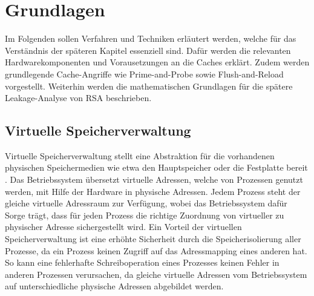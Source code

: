 \chapter{Grundlagen}
\label{chapter:basics}

Im Folgenden sollen Verfahren und Techniken %
erläutert werden, welche für das Verständnis der späteren Kapitel essenziell sind.
Dafür werden die relevanten Hardwarekomponenten und Vorausetzungen an die Caches erklärt.
Zudem werden grundlegende Cache-Angriffe wie Prime-and-Probe sowie Flush-and-Reload vorgestellt.
Weiterhin werden die mathematischen Grundlagen für die spätere Leakage-Analyse von RSA beschrieben.

\section{Virtuelle Speicherverwaltung}


Virtuelle Speicherverwaltung stellt eine Abstraktion für die vorhandenen physischen Speichermedien wie etwa den Hauptspeicher oder die Festplatte bereit \cite{tanenbaumVirtualMemory}.
Das Betriebssystem übersetzt virtuelle Adressen, welche von Prozessen genutzt werden, mit Hilfe der Hardware in physische Adressen. 
Jedem Prozess steht der gleiche virtuelle Adressraum zur Verfügung, wobei das Betriebssystem dafür Sorge trägt, dass für jeden Prozess die richtige Zuordnung von virtueller zu physischer Adresse sichergestellt wird.
Ein Vorteil der virtuellen Speicherverwaltung ist eine erhöhte Sicherheit durch die Speicherisolierung aller Prozesse, da ein Prozess keinen Zugriff auf das Adressmapping eines anderen hat.
So kann eine fehlerhafte Schreiboperation eines Prozesses keinen Fehler in anderen Prozessen verursachen, da gleiche virtuelle Adressen vom Betriebssystem auf unterschiedliche physische Adressen abgebildet werden.


